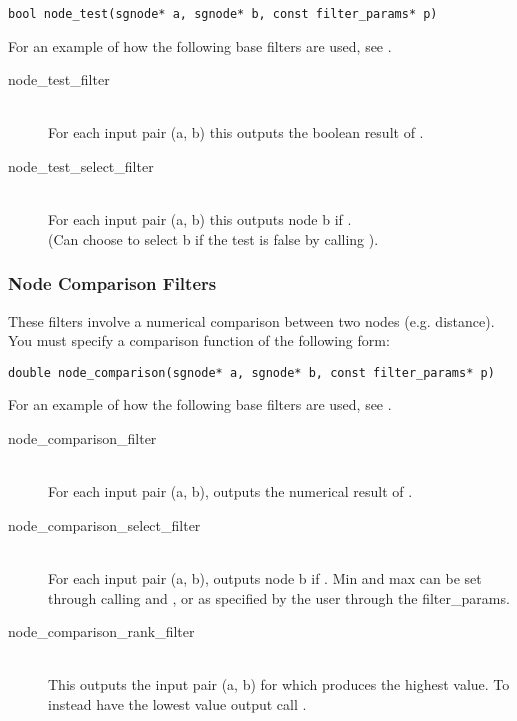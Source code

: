\begin{verbatim}
bool node_test(sgnode* a, sgnode* b, const filter_params* p)
\end{verbatim}

For an example of how the following base filters are used, see .

\begin{description}
	\item[node\_test\_filter] \hfill \\
		For each input pair (a, b) this outputs the boolean result of .
	\item[node\_test\_select\_filter] \hfill \\
		For each input pair (a, b) this outputs node b if . \\
		(Can choose to select b if the test is false by calling ).
\end{description}

\subsubsection{Node Comparison Filters}
These filters involve a numerical comparison between two nodes (e.g. distance). 
You must specify a comparison function of the following form:
\begin{verbatim}
double node_comparison(sgnode* a, sgnode* b, const filter_params* p)
\end{verbatim}

For an example of how the following base filters are used, see .

\begin{description}
	\item[node\_comparison\_filter] \hfill \\
		For each input pair (a, b), outputs the numerical result of . 
	\item[node\_comparison\_select\_filter] \hfill \\
		For each input pair (a, b), outputs node b if . Min and max can be set through calling  and , or as specified by the user through the filter\_params. 
	\item[node\_comparison\_rank\_filter] \hfill \\
		This outputs the input pair (a, b) for which  produces the highest value. To instead have the lowest value output call .
\end{description}



